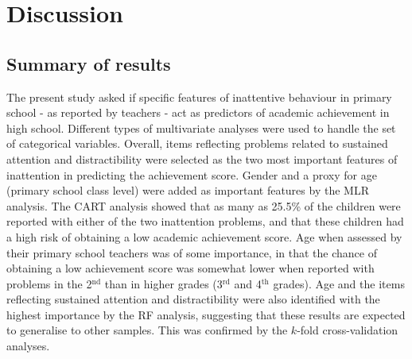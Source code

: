 \documentclass[10pt,letterpaper]{article}
\begin{document}
{\begin{table}[!ht]
\end{table}

  \vspace{-5mm}
  

\section*{Discussion}
\subsection*{Summary of results}
The present study asked if specific features of inattentive behaviour in primary school - as reported by teachers - act as predictors of academic achievement in high school. Different types of multivariate analyses were used to handle the set of categorical variables.  Overall, items reflecting problems related to sustained attention and distractibility were selected as the two most important features of inattention in predicting the achievement score. Gender and a proxy for age (primary school class level) were added as important features by the MLR analysis. The CART analysis showed that as many as 25.5\% of the children were reported with either of the two inattention problems, and that these children had a high risk of obtaining a low academic achievement score. Age  when assessed by their primary school teachers was of some importance, in that the chance of obtaining a low achievement score was somewhat lower when reported with problems in the  2$^{\text{nd}}$ than in higher grades (3$^{\text{rd}}$ and 4$^{\text{th}}$  grades). Age and the items reflecting sustained attention and distractibility were also identified with the highest importance by the RF analysis, suggesting that these results are expected to generalise to other samples. 
This was confirmed by the $k$-fold cross-validation analyses.\\


}
\end{document}
